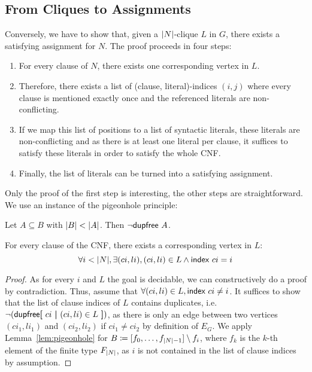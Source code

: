 \subsection{From Cliques to Assignments}
Conversely, we have to show that, given a $|N|$-clique $L$ in $G$, there exists a satisfying assignment for $N$. The proof proceeds in four steps:
\begin{enumerate}
  \item For every clause of $N$, there exists one corresponding vertex in $L$.
  \item Therefore, there exists a list of (clause, literal)-indices $(i, j)$ where every clause is mentioned exactly once and the referenced literals are non-conflicting. 
  \item If we map this list of positions to a list of syntactic literals, these literals are non-conflicting and as there is at least one literal per clause, it suffices to satisfy these literals in order to satisfy the whole CNF.
  \item Finally, the list of literals can be turned into a satisfying assignment.
\end{enumerate}

Only the proof of the first step is interesting, the other steps are straightforward.
We use an instance of the pigeonhole principle: 
\begin{lemma}\label{lem:pigeonhole}
  Let $A \subseteq B$ with $|B| < |A|$. Then $\lnot \textsf{dupfree}~A$. 
\end{lemma}

\begin{lemma}
  For every clause of the CNF, there exists a corresponding vertex in $L$:
  \[\forall i < |N|, \exists (ci, li), (ci, li) \in L \land \textsf{index}~ci = i \]
\end{lemma}
\begin{proof}
  As for every $i$ and $L$ the goal is decidable, we can constructively do a proof by contradiction. Thus, assume that $\forall (ci, li) \in L, \textsf{index}~ci \neq i$. It suffices to show that the list of clause indices of $L$ contains duplicates, i.e. $\lnot (\textsf{dupfree} \textbf{[}~ ci ~\textbf{|}~ (ci, li) \in L ~\textbf{]})$, as there is only an edge between two vertices $(ci_1, li_1)$ and $(ci_2, li_2)$ if $ci_1 \neq ci_2$ by definition of $E_G$. 
  We apply Lemma~\ref{lem:pigeonhole} for $B \coloneqq [f_0, \ldots, f_{|N| -1}] \setminus f_i$, where $f_k$ is the $k$-th element of the finite type $F_{|N|}$, as $i$ is not contained in the list of clause indices by assumption. 
\end{proof}

